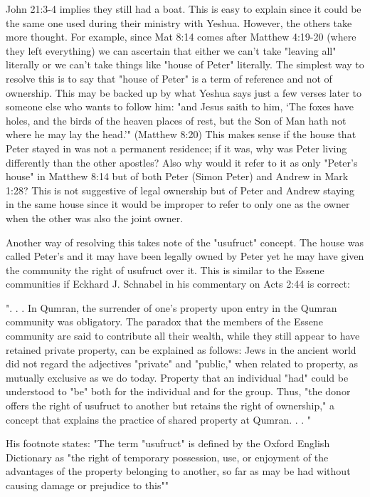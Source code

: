 \documentclass[11pt]{article}
\begin{document}
John 21:3-4 implies they still had a boat. This is easy to explain since it could be the same one used during their ministry with Yeshua. However, the others take more thought. For example, since Mat 8:14 comes after Matthew 4:19-20 (where they left everything) we can ascertain that either we can't take "leaving all" literally or we can't take things like "house of Peter" literally. The simplest way to resolve this is to say that "house of Peter" is a term of reference and not of ownership. This may be backed up by what Yeshua says just a few verses later to someone else who wants to follow him: "and Jesus saith to him, ‘The foxes have holes, and the birds of the heaven places of rest, but the Son of Man hath not where he may lay the head.’" (Matthew 8:20) This makes sense if the house that Peter stayed in was not a permanent residence; if it was, why was Peter living differently than the other apostles? Also why would it refer to it as only "Peter's house" in Matthew 8:14 but of both Peter (Simon Peter) and Andrew in Mark 1:28? This is not suggestive of legal ownership but of Peter and Andrew staying in the same house since it would be improper to refer to only one as the owner when the other was also the joint owner.

Another way of resolving this takes note of the "usufruct" concept. The house was called Peter's and it may have been legally owned by Peter yet he may have given the community the right of usufruct over it. This is similar to the Essene communities if Eckhard J. Schnabel in his commentary on Acts 2:44 is correct:

". . . In Qumran, the surrender of one's property upon entry in the Qumran community was obligatory. The paradox that the members of the Essene community are said to contribute all their wealth, while they still appear to have retained private property, can be explained as follows: Jews in the ancient world did not regard the adjectives "private" and "public," when related to property, as mutually exclusive as we do today. Property that an individual "had" could be understood to "be" both for the individual and for the group. Thus, "the donor offers the right of usufruct to another but retains the right of ownership," a concept that explains the practice of shared property at Qumran. . . " \cite{usufruct Schnabel} 

His footnote states: "The term "usufruct" is defined by the Oxford English Dictionary as "the right of temporary possession, use, or enjoyment of the advantages of the property belonging to another, so far as may be had without causing damage or prejudice to this"" \cite{usufruct Schnabel}
\end{document}
